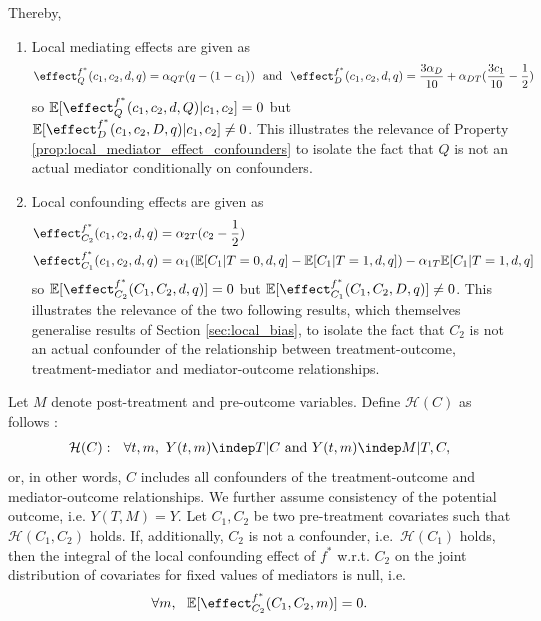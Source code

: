 Thereby,
\begin{enumerate}
    \item Local mediating effects are given as
    \begin{align*}
        \effect^{f^*}_{Q}(c_1,c_2,d,q) = \alpha_{QT}(q - (1-c_1)) \ \text{ and } \ \effect^{f^*}_{D}(c_1,c_2,d,q) = \frac{3\alpha_D}{10} + \alpha_{DT}(\frac{3c_1}{10} - \frac{1}{2})
    \end{align*}
    so $\mathbb{E}[\effect^{f^*}_{Q}(c_1,c_2,d,Q) | c_1, c_2] = 0$ but $\mathbb{E}[\effect^{f^*}_{D}(c_1,c_2,D,q) | c_1, c_2] \neq 0$. This illustrates the relevance of Property \ref{prop:local_mediator_effect_confounders} to isolate the fact that $Q$ is not an actual mediator conditionally on confounders.
    \item Local confounding effects are given as
    \begin{align*}
        \effect^{f^*}_{C_2}(c_1,c_2,d,q) &= \alpha_{2T}(c_2 - \frac{1}{2}) \\
        \effect^{f^*}_{C_1}(c_1,c_2,d,q) &= \alpha_1(\mathbb{E}[C_1|T=0,d,q] - \mathbb{E}[C_1|T=1,d,q]) - \alpha_{1T}\mathbb{E}[C_1|T=1,d,q] \\
    \end{align*}
    so $\mathbb{E}[\effect^{f^*}_{C_2}(C_1,C_2,d,q)] = 0$ but $\mathbb{E}[\effect^{f^*}_{C_1}(C_1,C_2,D,q)] \neq 0$. This illustrates the relevance of the two following results, which themselves generalise results of Section \ref{sec:local_bias}, to isolate the fact that $C_2$ is not an actual confounder of the relationship between treatment-outcome, treatment-mediator and mediator-outcome relationships.
    \end{enumerate}
    \begin{lemma} \label{lemma:local_confounding_effect_mediators}
 Let $M$ denote post-treatment and pre-outcome variables. Define $\mathcal{H}(C)$ as follows :
 \begin{align*}
 \mathcal{H}(C) : \ \ \forall t, m, \ Y(t,m) \indep T | C \text{ and } Y(t,m) \indep M | T, C,
 \end{align*}
 or, in other words, $C$ includes all confounders of the treatment-outcome and mediator-outcome relationships. We further assume consistency of the potential outcome, i.e. $Y(T,M) = Y$. Let $C_1, C_2$ be two pre-treatment covariates such that $\mathcal{H}(C_1, C_2)$ holds. If, additionally, $C_2$ is not a confounder, i.e.\ $\mathcal{H}(C_1)$ holds, then the integral of the local confounding effect of $f^*$ w.r.t. $C_2$ on the joint distribution of covariates for fixed values of mediators is null, i.e.
\begin{align*}
    \forall m, \ \ \mathbb{E}[\effect^{f^*}_{C_2}(C_1,C_2,m)] = 0.
\end{align*}
\end{lemma}
